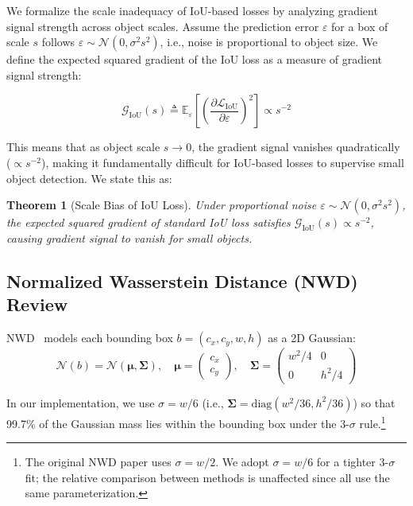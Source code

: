 \documentclass[journal]{IEEEtran}
\newtheorem{theorem}{Theorem}
\begin{document}
We formalize the scale inadequacy of IoU-based losses by analyzing gradient signal strength across object scales. Assume the prediction error $\varepsilon$ for a box of scale $s$ follows $\varepsilon \sim \mathcal{N}(0, \sigma^2 s^2)$, i.e., noise is proportional to object size. We define the expected squared gradient of the IoU loss as a measure of gradient signal strength:

\begin{equation}
  \mathcal{G}_{\text{IoU}}(s) \triangleq \mathbb{E}_{\varepsilon}\!\left[\left(\frac{\partial \mathcal{L}_{\text{IoU}}}{\partial \varepsilon}\right)^{\!2}\right] \propto s^{-2}
\end{equation}

This means that as object scale $s \to 0$, the gradient signal vanishes quadratically ($\propto s^{-2}$), making it fundamentally difficult for IoU-based losses to supervise small object detection. We state this as:

\begin{theorem}[Scale Bias of IoU Loss]
\label{thm:scale_bias}
Under proportional noise $\varepsilon \sim \mathcal{N}(0, \sigma^2 s^2)$, the expected squared gradient of standard IoU loss satisfies $\mathcal{G}_{\text{IoU}}(s) \propto s^{-2}$, causing gradient signal to vanish for small objects.
\end{theorem}

\subsection{Normalized Wasserstein Distance (NWD) Review}

NWD~\cite{wang2022nwd} models each bounding box $b = (c_x, c_y, w, h)$ as a 2D Gaussian:
\begin{equation}
  \mathcal{N}(b) = \mathcal{N}\left(\boldsymbol{\mu}, \boldsymbol{\Sigma}\right), \quad \boldsymbol{\mu} = \begin{pmatrix} c_x \\ c_y \end{pmatrix}, \quad \boldsymbol{\Sigma} = \begin{pmatrix} w^2/4 & 0 \\ 0 & h^2/4 \end{pmatrix}
\end{equation}

In our implementation, we use $\sigma = w/6$ (i.e., $\boldsymbol{\Sigma} = \text{diag}(w^2/36, h^2/36)$) so that 99.7\% of the Gaussian mass lies within the bounding box under the 3-$\sigma$ rule.\footnote{The original NWD paper uses $\sigma = w/2$. We adopt $\sigma = w/6$ for a tighter 3-$\sigma$ fit; the relative comparison between methods is unaffected since all use the same parameterization.}
\end{document}
